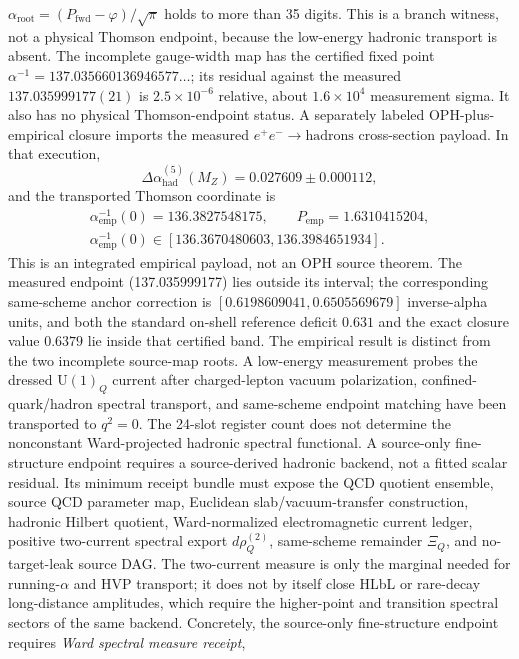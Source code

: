 \documentclass[11pt]{article}
\newcommand{\U}{\mathrm{U}}
\begin{document}
\(\alpha_{\mathrm{root}}=(P_{\mathrm{fwd}}-\varphi)/\sqrt{\pi}\) holds to more
than 35 digits. This is a branch witness, not a physical
Thomson endpoint, because the low-energy hadronic transport is absent.
The incomplete gauge-width map has the certified fixed point
\(\alpha^{-1}=137.035660136946577\ldots\); its residual against the measured
\(137.035999177(21)\) is \(2.5\times10^{-6}\) relative, about \(1.6\times10^{4}\)
measurement sigma. It also has no physical Thomson-endpoint status.
A separately labeled OPH-plus-empirical closure imports the measured
\(e^+e^-\!\to\mathrm{hadrons}\) cross-section payload.  In that execution,
\[
\Delta\alpha_{\mathrm{had}}^{(5)}(M_Z)
=0.027609\pm0.000112,
\]
and the transported Thomson coordinate is
\[
\begin{gathered}
\alpha_{\mathrm{emp}}^{-1}(0)=136.3827548175,
\qquad
P_{\mathrm{emp}}=1.6310415204,\\
\alpha_{\mathrm{emp}}^{-1}(0)\in
[136.3670480603,136.3984651934].
\end{gathered}
\]
This is an integrated empirical payload, not an OPH source theorem. The
measured endpoint (137.035999177) lies outside its interval; the corresponding
same-scheme anchor correction is
\([0.6198609041,0.6505569679]\) inverse-alpha units, and both the standard
on-shell reference deficit \(0.631\) and the exact closure value \(0.6379\)
lie inside that certified band. The empirical result is
distinct from the two incomplete source-map roots.
A low-energy
measurement probes the dressed \(\U(1)_Q\) current after charged-lepton vacuum
polarization, confined-quark/hadron spectral transport, and same-scheme endpoint
matching have been transported to \(q^2=0\). The 24-slot register count
does not determine the nonconstant Ward-projected hadronic spectral functional.
A source-only fine-structure endpoint requires a source-derived hadronic backend, not
a fitted scalar residual. Its minimum receipt bundle must expose the QCD
quotient ensemble, source QCD parameter map, Euclidean slab/vacuum-transfer
construction, hadronic Hilbert quotient, Ward-normalized electromagnetic current
ledger, positive two-current spectral export \(d\rho_Q^{(2)}\), same-scheme
remainder \(\Xi_Q\), and no-target-leak source DAG. The two-current measure is
only the marginal needed for running-\(\alpha\) and HVP transport; it does not
by itself close HLbL or rare-decay long-distance amplitudes, which require the
higher-point and transition spectral sectors of the same backend. Concretely,
the source-only fine-structure endpoint requires
\emph{Ward spectral measure receipt},
\end{document}
